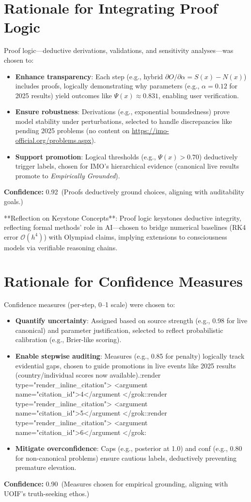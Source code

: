 \documentclass[11pt]{article}
\newcommand{\Sx}{S(x)}
\newcommand{\Nx}{N(x)}
\newcommand{\Px}{\Psi(x)}
\newcommand{\conf}[2]{\textbf{Confidence:} #1\ (#2)}
\begin{document}
\section{Rationale for Integrating Proof Logic}
Proof logic—deductive derivations, validations, and sensitivity analyses—was chosen to:
\begin{itemize}[leftmargin=1.35em]
  \item \textbf{Enhance transparency}: Each step (e.g., hybrid $\partial O / \partial \alpha = \Sx - \Nx$) includes proofs, logically demonstrating why parameters (e.g., $\alpha=0.12$ for 2025 results) yield outcomes like $\Px \approx 0.831$, enabling user verification.
  \item \textbf{Ensure robustness}: Derivations (e.g., exponential boundedness) prove model stability under perturbations, selected to handle discrepancies like pending 2025 problems (no content on \url{https://imo-official.org/problems.aspx}).
  \item \textbf{Support promotion}: Logical thresholds (e.g., $\Px > 0.70$) deductively trigger labels, chosen for IMO's hierarchical evidence (canonical live results promote to \emph{Empirically Grounded}).
\end{itemize}
\conf{0.92}{Proofs deductively ground choices, aligning with auditability goals.}

**Reflection on Keystone Concepts**: Proof logic keystones deductive integrity, reflecting formal methods' role in AI—chosen to bridge numerical baselines (RK4 error $\mathcal{O}(h^4)$) with Olympiad claims, implying extensions to consciousness models via verifiable reasoning chains.

\section{Rationale for Confidence Measures}
Confidence measures (per-step, 0--1 scale) were chosen to:
\begin{itemize}[leftmargin=1.35em]
  \item \textbf{Quantify uncertainty}: Assigned based on source strength (e.g., 0.98 for live canonical) and parameter justification, selected to reflect probabilistic calibration (e.g., Brier-like scoring).
  \item \textbf{Enable stepwise auditing}: Measures (e.g., 0.85 for penalty) logically track evidential gaps, chosen to guide promotions in live events like 2025 results (country/individual scores now available).\grok:render type="render_inline_citation">
<argument name="citation_id">4</argument
</grok:\grok:render type="render_inline_citation">
<argument name="citation_id">5</argument
</grok:\grok:render type="render_inline_citation">
<argument name="citation_id">6</argument
</grok:
  \item \textbf{Mitigate overconfidence}: Caps (e.g., posterior at 1.0) and conf (e.g., 0.80 for non-canonical problems) ensure cautious labels, deductively preventing premature elevation.
\end{itemize}
\conf{0.90}{Measures chosen for empirical grounding, aligning with UOIF's truth-seeking ethos.}
\end{document}
